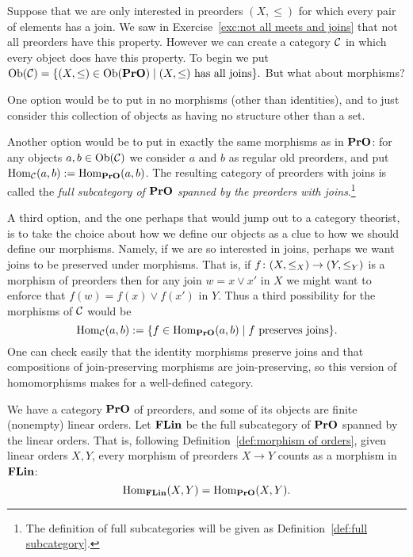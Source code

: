 \documentclass[CT4S-EN-RU]{subfiles}
\begin{document}
\begin{exampleENG}\label{ex:preorders with joins}
Suppose that we are only interested in preorders $(X,\leq)$ for which every pair of elements has a join. We saw in Exercise~\ref{exc:not all meets and joins} that not all preorders have this property. However we can create a category $\mathcal{C}$ in which every object does have this property. To begin we put $\textnormal{Ob}(\mathcal{C})=\{(X,\leq)\in\textnormal{Ob}({\mathbf{PrO}}){\;|\;} (X,\leq)\textnormal{ has all joins}\}.$ But what about morphisms?

One option would be to put in no morphisms (other than identities), and to just consider this collection of objects as having no structure other than a set.

Another option would be to put in exactly the same morphisms as in ${\mathbf{PrO}}$: for any objects $a,b\in\textnormal{Ob}(\mathcal{C})$ we consider $a$ and $b$ as regular old preorders, and put $\textnormal{Hom}_\mathcal{C}(a,b):=\textnormal{Hom}_{{\mathbf{PrO}}}(a,b)$. The resulting category of preorders with joins is called the {\em full subcategory of ${\mathbf{PrO}}$ spanned by the preorders with joins}.\footnote{The definition of full subcategories will be given as Definition~\ref{def:full subcategory}.}

A third option, and the one perhaps that would jump out to a category theorist, is to take the choice about how we define our objects as a clue to how we should define our morphisms. Namely, if we are so interested in joins, perhaps we want joins to be preserved under morphisms. That is, if $f\colon (X,\leq_X)\rightarrow (Y,\leq_Y)$ is a morphism of preorders then for any join $w=x\vee x'$ in $X$ we might want to enforce that $f(w)=f(x)\vee f(x')$ in $Y$. Thus a third possibility for the morphisms of $\mathcal{C}$ would be $$\textnormal{Hom}_\mathcal{C}(a,b):=\{f\in\textnormal{Hom}_{{\mathbf{PrO}}}(a,b){\;|\;}f \textnormal{ preserves joins}\}.$$ One can check easily that the identity morphisms preserve joins and that compositions of join-preserving morphisms are join-preserving, so this version of homomorphisms makes for a well-defined category.
\end{exampleENG}

\begin{exampleRUS}\label{ex:preorders with joins}
\end{exampleRUS}

\begin{exampleENG}\label{ex:FLin}
We have a category ${\mathbf{PrO}}$ of preorders, and some of its objects are finite (nonempty) linear orders. Let ${\mathbf{FLin}}$ be the full subcategory of ${\mathbf{PrO}}$ spanned by the linear orders. That is, following Definition~\ref{def:morphism of orders}, given linear orders $X,Y$, every morphism of preorders $X\to Y$ counts as a morphism in ${\mathbf{FLin}}$: $$\textnormal{Hom}_{\mathbf{FLin}}(X,Y)=\textnormal{Hom}_{\mathbf{PrO}}(X,Y).$$ 
\end{exampleENG}
\end{document}

